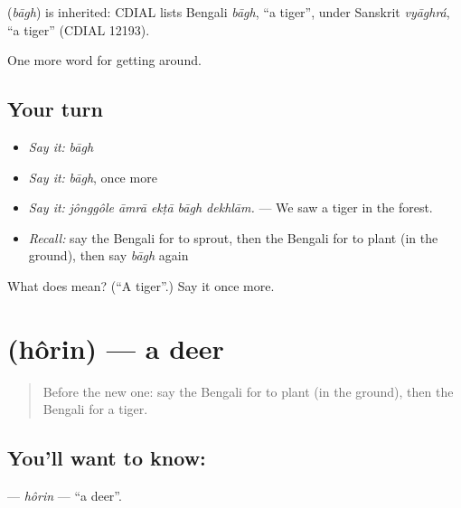 \begin{cousinweb}
\textbf{} (\emph{bāgh}) is inherited: CDIAL lists Bengali \emph{bāgh}, \textquotedblleft{}a tiger\textquotedblright{}, under Sanskrit \emph{vyāghrá}, \textquotedblleft{}a tiger\textquotedblright{} (CDIAL 12193).
\end{cousinweb}

\begin{grammarlens}[title={What you've built}]
One more word for getting around.
\end{grammarlens}

\subsection*{Your turn}
\begin{itemize}
\raggedright
  \item \emph{Say it:} \emph{bāgh}
  \item \emph{Say it:} \emph{bāgh}, once more
  \item \emph{Say it:} \emph{jônggôle āmrā ekṭā bāgh dekhlām.} — We saw a tiger in the forest.
  \item \emph{Recall:} say the Bengali for to sprout, then the Bengali for to plant (in the ground), then say \emph{bāgh} again
\end{itemize}

\begin{tcolorbox}[breakable,colback=teal!4,colframe=teal!35!black,title={Before you move on}]
What does  mean? (\textquotedblleft{}A tiger\textquotedblright{}.) Say it once more.
\end{tcolorbox}
\section[\texorpdfstring{\bn{হরিণ} (hôrin)}{হরিণ (hôrin)}]{ (hôrin) — a deer}

\label{lesson:BN-C437-horin}



\begin{quote}
Before the new one: say the Bengali for to plant (in the ground), then the Bengali for a tiger.
\end{quote}

\subsection*{You'll want to know: }
\textbf{} — \emph{hôrin} — \textquotedblleft{}a deer\textquotedblright{}.

